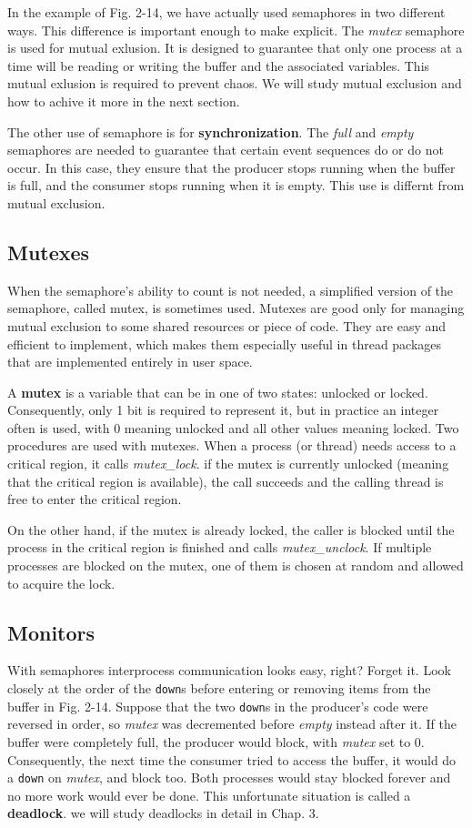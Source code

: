 \documentclass{book}
\newcommand {\kw}  [1] {\textbf{#1}}
\newcommand {\sys} [1] {\textsl{#1}}
\newcommand {\cmd} [1] {\texttt{#1}}
\begin{document}
In the example of Fig. 2-14, we have actually used semaphores in two different ways.
This difference is important enough to make explicit.
The \sys{mutex} semaphore is used for mutual exlusion.
It is designed to guarantee that only one process at a time will be reading or writing the buffer and the associated variables.
This mutual exlusion is required to prevent chaos.
We will study mutual exclusion and how to achive it more in the next section.

The other use of semaphore is for \kw{synchronization}.
The \sys{full} and \sys{empty} semaphores are needed to guarantee that certain event sequences do or do not occur.
In this case, they ensure that the producer stops running when the buffer is full, and the consumer stops running when it is empty.
This use is differnt from mutual exclusion.

\subsection{Mutexes}
When the semaphore's ability to count is not needed, a simplified version of the semaphore, called mutex, is sometimes used.
Mutexes are good only for managing mutual exclusion to some shared resources or piece of code.
They are easy and efficient to implement, which makes them especially useful in thread packages that are implemented entirely in user space.

A \kw{mutex} is a variable that can be in one of two states: unlocked or locked.
Consequently, only 1 bit is required to represent it, but in practice an integer often is used, 
with 0 meaning unlocked and all other values meaning locked.
Two procedures are used with mutexes.
When a process (or thread) needs access to a critical region, it calls \sys{mutex\_lock}.
if the mutex is currently unlocked (meaning that the critical region is available),
the call succeeds and the calling thread is free to enter the critical region.

On the other hand, if the mutex is already locked, the caller is blocked until the process in the critical region is finished 
and calls \sys{mutex\_unclock}.
If multiple processes are blocked on the mutex, one of them is chosen at random and allowed to acquire the lock.

\subsection{Monitors}
With semaphores interprocess communication looks easy, right? Forget it.
Look closely at the order of the \cmd{down}s before entering or removing items from the buffer in Fig. 2-14.
Suppose that the two \cmd{down}s in the producer's code were reversed in order, 
so \sys{mutex} was decremented before \sys{empty} instead after it.
If the buffer were completely full, the producer would block, with \sys{mutex} set to 0.
Consequently, the next time the consumer tried to access the buffer, it would do a \cmd{down} on \sys{mutex}, and block too.
Both processes would stay blocked forever and no more work would ever be done.
This unfortunate situation is called a \kw{deadlock}.
we will study deadlocks in detail in Chap. 3.
\end{document}
